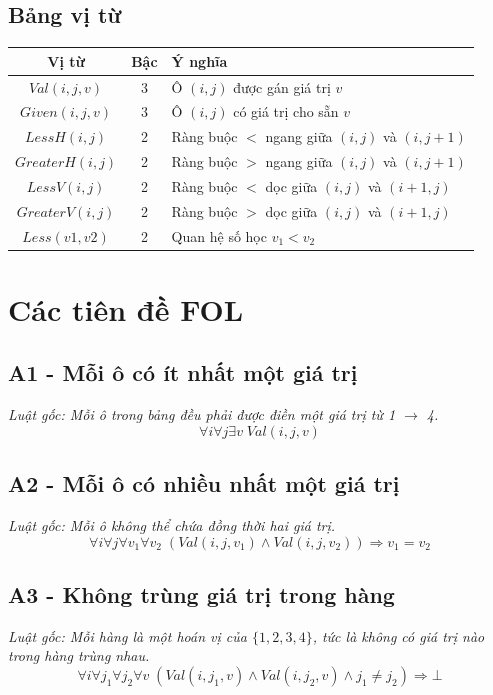 \subsection{Bảng vị từ}

\begin{longtable}{|c|c|p{8cm}|}
\hline
\textbf{Vị từ} & \textbf{Bậc} & \textbf{Ý nghĩa} \\
\hline
$Val(i,j,v)$ & 3 & Ô $(i,j)$ được gán giá trị $v$ \\
\hline
$Given(i,j,v)$ & 3 & Ô $(i,j)$ có giá trị cho sẵn $v$ \\
\hline
$LessH(i,j)$ & 2 & Ràng buộc $<$ ngang giữa $(i,j)$ và $(i,j+1)$ \\
\hline
$GreaterH(i,j)$ & 2 & Ràng buộc $>$ ngang giữa $(i,j)$ và $(i,j+1)$ \\
\hline
$LessV(i,j)$ & 2 & Ràng buộc $<$ dọc giữa $(i,j)$ và $(i+1,j)$ \\
\hline
$GreaterV(i,j)$ & 2 & Ràng buộc $>$ dọc giữa $(i,j)$ và $(i+1,j)$ \\
\hline
$Less(v1,v2)$ & 2 & Quan hệ số học $v_1 < v_2$ \\
\hline
\end{longtable}

\section{Các tiên đề FOL}

\subsection*{A1 - Mỗi ô có ít nhất một giá trị}
\textit{Luật gốc: Mỗi ô trong bảng đều phải được điền một giá trị từ 1 $\to$ 4.}
\[
\forall i \forall j \exists v \; Val(i,j,v)
\]

\subsection*{A2 - Mỗi ô có nhiều nhất một giá trị}
\textit{Luật gốc: Mỗi ô không thể chứa đồng thời hai giá trị.}
\[
\forall i \forall j \forall v_1 \forall v_2 \; 
(Val(i,j,v_1) \land Val(i,j,v_2)) \Rightarrow v_1 = v_2
\]

\subsection*{A3 - Không trùng giá trị trong hàng}
\textit{Luật gốc: Mỗi hàng là một hoán vị của $\{1, 2, 3, 4\}$, tức là không có giá trị nào trong hàng trùng nhau.}
\[
\forall i \forall j_1 \forall j_2 \forall v \;
(Val(i,j_1,v) \land Val(i,j_2,v) \land j_1 \neq j_2) \Rightarrow \bot
\]

